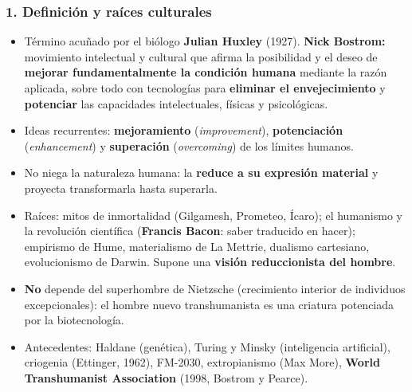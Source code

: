 \documentclass[10pt,a4paper]{article}
\begin{document}
\subsubsection{1. Definición y raíces culturales}
\begin{itemize}
\item Término acuñado por el biólogo \textbf{Julian Huxley} (1927). \textbf{Nick Bostrom:} movimiento intelectual y cultural que afirma la posibilidad y el deseo de \textbf{mejorar fundamentalmente la condición humana} mediante la razón aplicada, sobre todo con tecnologías para \textbf{eliminar el envejecimiento} y \textbf{potenciar} las capacidades intelectuales, físicas y psicológicas.
\item Ideas recurrentes: \textbf{mejoramiento} (\textit{improvement}), \textbf{potenciación} (\textit{enhancement}) y \textbf{superación} (\textit{overcoming}) de los límites humanos.
\item No niega la naturaleza humana: la \textbf{reduce a su expresión material} y proyecta transformarla hasta superarla.
\item Raíces: mitos de inmortalidad (Gilgamesh, Prometeo, Ícaro); el humanismo y la revolución científica (\textbf{Francis Bacon}: saber traducido en hacer); empirismo de Hume, materialismo de La Mettrie, dualismo cartesiano, evolucionismo de Darwin. Supone una \textbf{visión reduccionista del hombre}.
\item \textbf{No} depende del superhombre de Nietzsche (crecimiento interior de individuos excepcionales): el hombre nuevo transhumanista es una criatura potenciada por la biotecnología.
\item Antecedentes: Haldane (genética), Turing y Minsky (inteligencia artificial), criogenia (Ettinger, 1962), FM-2030, extropianismo (Max More), \textbf{World Transhumanist Association} (1998, Bostrom y Pearce).
\end{itemize}
\end{document}
